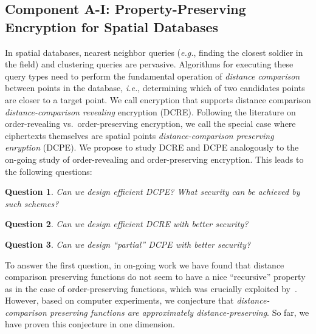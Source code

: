 \documentclass[11pt]{article}
\newtheorem{question}{Question}[section]
\theoremstyle{remark}
\begin{document}
\subsection{Component A-I:  Property-Preserving Encryption for Spatial Databases}

In spatial databases, nearest neighbor queries (\emph{e.g.}, finding the closest soldier in the field) and clustering queries are pervasive.  Algorithms for executing these query types need to perform the fundamental operation of \emph{distance comparison} between points in the database, \emph{i.e.}, determining which of two candidates points are closer to a target point.  We call encryption that supports distance comparison \emph{distance-comparison revealing} encryption (DCRE).  Following the literature on order-revealing vs.~order-preserving encryption, we call the special case where ciphertexts themselves are spatial points \emph{distance-comparison preserving enryption} (DCPE).  We propose to study DCRE and DCPE analogously to the on-going study of order-revealing and order-preserving encryption.  
This leads to the following questions:

\begin{question}
Can we design efficient DCPE?  What security can be achieved by such schemes?
\end{question}


\begin{question}
Can we design efficient DCRE with better security?
\end{question}

\begin{question}
Can we design ``partial'' DCPE with better security?
\end{question}

To answer the first question, in on-going work we have found that distance comparison preserving functions do not seem to have a nice ``recursive'' property as in the case of order-preserving functions, which was crucially exploited by~\cite{EC:BCLO09}.  However, based on computer experiments, we conjecture that \emph{distance-comparison preserving functions are approximately distance-preserving}.    So far, we have proven this conjecture in one dimension.
\end{document}
